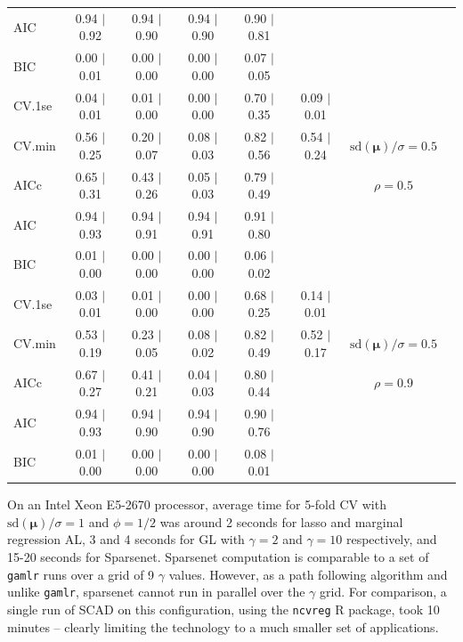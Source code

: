 \documentclass[12pt]{article}
\newcommand{\mr}[1]{\mathrm{#1}}
\newcommand{\bm}[1]{\mathbf{#1}}
\begin{document}
\begin{table}[p]
\begin{center}
\begin{tabular}{l*{6}{c}|r}
AIC & 0.94 $\mid$ 0.92 & 0.94 $\mid$ 0.90 & 0.94 $\mid$ 0.90 & 0.90 $\mid$ 0.81 & &  \\
BIC & 0.00 $\mid$ 0.01 & 0.00 $\mid$ 0.00 & 0.00 $\mid$ 0.00 & 0.07 $\mid$ 0.05 & & \\
 \hline 
CV.1se & 0.04 $\mid$ 0.01 & 0.01 $\mid$ 0.00 & 0.00 $\mid$ 0.00 & 0.70 $\mid$ 0.35 & 0.09 $\mid$ 0.01 &\\
CV.min & 0.56 $\mid$ 0.25 & 0.20 $\mid$ 0.07 & 0.08 $\mid$ 0.03 & 0.82 $\mid$ 0.56 & 0.54 $\mid$ 0.24 &  $\mr{sd}(\bm{\mu})/\sigma=0.5$ \\
AICc & 0.65 $\mid$ 0.31 & 0.43 $\mid$ 0.26 & 0.05 $\mid$ 0.03 & 0.79 $\mid$ 0.49 & & $\rho=0.5$ \\
AIC & 0.94 $\mid$ 0.93 & 0.94 $\mid$ 0.91 & 0.94 $\mid$ 0.91 & 0.91 $\mid$ 0.80 & &  \\
BIC & 0.01 $\mid$ 0.00 & 0.00 $\mid$ 0.00 & 0.00 $\mid$ 0.00 & 0.06 $\mid$ 0.02 & & \\
 \hline 
CV.1se & 0.03 $\mid$ 0.01 & 0.01 $\mid$ 0.00 & 0.00 $\mid$ 0.00 & 0.68 $\mid$ 0.25 & 0.14 $\mid$ 0.01 &\\
CV.min & 0.53 $\mid$ 0.19 & 0.23 $\mid$ 0.05 & 0.08 $\mid$ 0.02 & 0.82 $\mid$ 0.49 & 0.52 $\mid$ 0.17 &  $\mr{sd}(\bm{\mu})/\sigma=0.5$ \\
AICc & 0.67 $\mid$ 0.27 & 0.41 $\mid$ 0.21 & 0.04 $\mid$ 0.03 & 0.80 $\mid$ 0.44 & & $\rho=0.9$ \\
AIC & 0.94 $\mid$ 0.93 & 0.94 $\mid$ 0.90 & 0.94 $\mid$ 0.90 & 0.90 $\mid$ 0.76 & &  \\
BIC & 0.01 $\mid$ 0.00 & 0.00 $\mid$ 0.00 & 0.00 $\mid$ 0.00 & 0.08 $\mid$ 0.01 & & \\
 \hline \end{tabular}
\end{center}
\vspace{-1cm}
\end{table}

On an Intel Xeon E5-2670 processor, average time for 5-fold CV with $\mr{sd}(\bm{\mu})/\sigma=1$ and $\phi=1/2$ was around 2 seconds for lasso and marginal regression AL, 3 and 4 seconds for GL with $\gamma=2$ and $\gamma=10$ respectively, and 15-20 seconds for Sparsenet. Sparsenet computation is comparable to a set of {\tt gamlr} runs over a grid of 9 $\gamma$ values.  However, as a path following algorithm and unlike {\tt gamlr}, sparsenet cannot run in parallel over the $\gamma$ grid.   For comparison,  a single run of SCAD on this configuration, using the {\tt ncvreg} R package, took 10 minutes -- clearly limiting the technology to a much smaller set of  applications.
\end{document}
